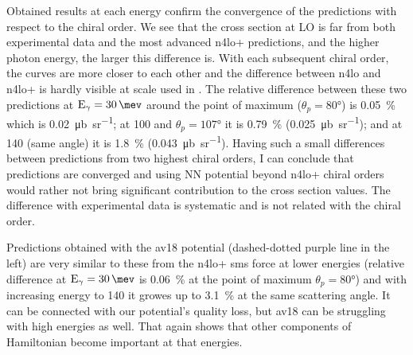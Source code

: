     Obtained results at each energy confirm the convergence 
    of the predictions with respect to the chiral order.
    We see that the cross section at LO is far from both experimental 
    data and the most advanced \gls{n4lo+} predictions, and
    the higher photon energy, the larger this
    difference is. With each subsequent chiral order, the 
    curves are more closer to each other and the difference
    between \gls{n4lo} and \gls{n4lo+} is hardly visible at scale used in .
    The relative difference between these two predictions at $\text{E}_\gamma=\SI{30}{\mev}$ around the point of maximum 
    ($\theta_p = \ang{80}$) is \SI{0.05}{\percent} which is \SI{0.02}{\micro \barn \per \steradian};
    at \SI{100}{\mev} and $\theta_p = \ang{107}$ it is \SI{0.79}{\percent} (\SI{0.025}{\micro \barn \per \steradian});
    and at \SI{140}{\mev} (same angle) it is \SI{1.8}{\percent} (\SI{0.043}{\micro \barn \per \steradian}).
    Having such a small differences between predictions from two highest chiral orders,
    I can conclude that predictions are converged and 
    using NN potential beyond \gls{n4lo+} chiral orders would rather not bring significant contribution 
    to the cross section values. 
    The difference with experimental data is systematic 
    and is not related with the chiral order. 
    

    Predictions obtained with the \gls{av18} potential 
    (dashed-dotted purple line in the  left)
    are very similar to these from the \gls{n4lo+} \gls{sms}  force at lower energies
    (relative difference at $\text{E}_\gamma=\SI{30}{\mev}$ is \SI{0.06}{\percent}
    at the point of maximum $\theta_p = \ang{80}$) and with increasing energy to \SI{140}{\mev}
    it growes up to \SI{3.1}{\percent} at the same scattering angle. 
    It can be connected with our potential's quality loss, but \gls{av18} can
    be struggling with high energies as well.
    That  again shows that other 
    components of Hamiltonian become important at that energies.

